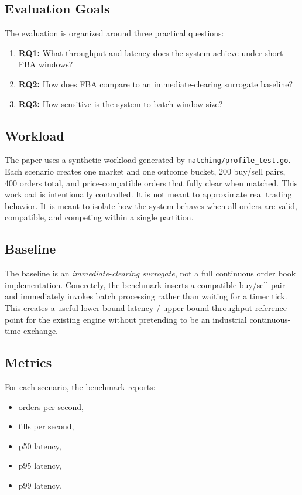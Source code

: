 \documentclass[11pt]{article}
\begin{document}
\subsection{Evaluation Goals}

The evaluation is organized around three practical questions:

\begin{enumerate}[leftmargin=1.5em]
  \item \textbf{RQ1:} What throughput and latency does the system achieve under short FBA windows?
  \item \textbf{RQ2:} How does FBA compare to an immediate-clearing surrogate baseline?
  \item \textbf{RQ3:} How sensitive is the system to batch-window size?
\end{enumerate}

\subsection{Workload}

The paper uses a synthetic workload generated by \texttt{matching/profile\_test.go}. Each scenario creates one market and one outcome bucket, 200 buy/sell pairs, 400 orders total, and price-compatible orders that fully clear when matched. This workload is intentionally controlled. It is not meant to approximate real trading behavior. It is meant to isolate how the system behaves when all orders are valid, compatible, and competing within a single partition.

\subsection{Baseline}

The baseline is an \emph{immediate-clearing surrogate}, not a full continuous order book implementation. Concretely, the benchmark inserts a compatible buy/sell pair and immediately invokes batch processing rather than waiting for a timer tick. This creates a useful lower-bound latency / upper-bound throughput reference point for the existing engine without pretending to be an industrial continuous-time exchange.

\subsection{Metrics}

For each scenario, the benchmark reports:

\begin{itemize}[leftmargin=1.5em]
  \item orders per second,
  \item fills per second,
  \item p50 latency,
  \item p95 latency,
  \item p99 latency.
\end{itemize}
\end{document}
